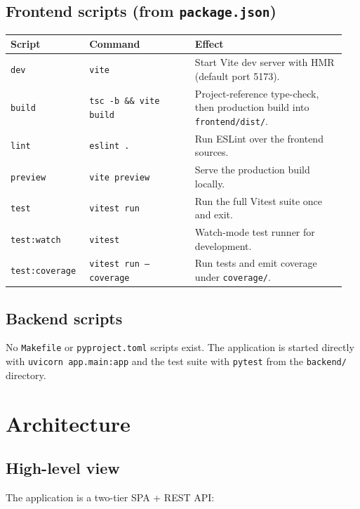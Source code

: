 \documentclass[11pt,a4paper]{article}
\begin{document}
\subsection{Frontend scripts (from \texttt{package.json})}
\begin{longtable}{@{}p{0.22\linewidth} p{0.30\linewidth} p{0.43\linewidth}@{}}
\toprule
\textbf{Script} & \textbf{Command} & \textbf{Effect} \\
\midrule
\texttt{dev}              & \texttt{vite}                         & Start Vite dev server with HMR (default port 5173). \\
\texttt{build}            & \texttt{tsc -b \&\& vite build}       & Project-reference type-check, then production build into \texttt{frontend/dist/}. \\
\texttt{lint}             & \texttt{eslint .}                     & Run ESLint over the frontend sources. \\
\texttt{preview}          & \texttt{vite preview}                 & Serve the production build locally. \\
\texttt{test}             & \texttt{vitest run}                   & Run the full Vitest suite once and exit. \\
\texttt{test:watch}       & \texttt{vitest}                       & Watch-mode test runner for development. \\
\texttt{test:coverage}    & \texttt{vitest run --coverage}        & Run tests and emit coverage under \texttt{coverage/}. \\
\bottomrule
\end{longtable}

\subsection{Backend scripts}
No \texttt{Makefile} or \texttt{pyproject.toml} scripts exist. The application
is started directly with \texttt{uvicorn app.main:app} and the test suite with
\texttt{pytest} from the \texttt{backend/} directory.

\section{Architecture}
\label{sec:arch}

\subsection{High-level view}
The application is a two-tier SPA + REST API:
\end{document}

